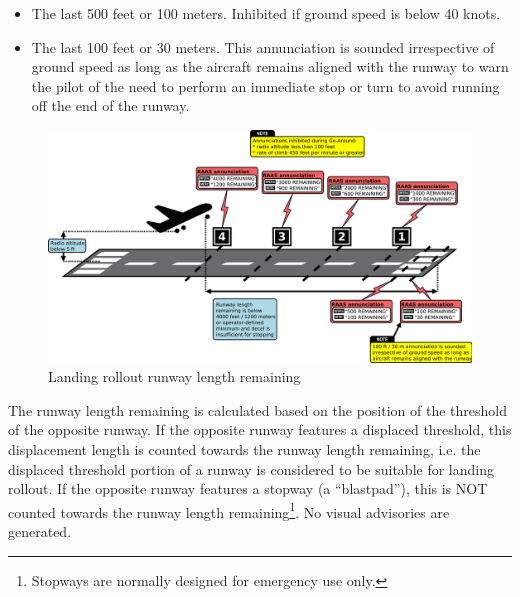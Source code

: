\documentclass[a4paper,12pt]{article}
\begin{document}
\begin{itemize}

\item The last 500 feet or 100 meters. Inhibited if ground speed is below
40 knots.

\item The last 100 feet or 30 meters. This annunciation is sounded
irrespective of ground speed as long as the aircraft remains aligned with
the runway to warn the pilot of the need to perform an immediate stop or
turn to avoid running off the end of the runway.

\end{itemize}

\begin{figure}[H]
\begin{center}
\includegraphics[width=\textwidth]{../src/land_rollout.pdf}
\end{center}
\caption{Landing rollout runway length remaining}
\end{figure}

\noindent The runway length remaining is calculated based on the position
of the threshold of the opposite runway. If the opposite runway features
a displaced threshold, this displacement length is counted towards the
runway length remaining, i.e. the displaced threshold portion of a runway
is considered to be suitable for landing rollout. If the opposite runway
features a stopway (a ``blastpad''), this is NOT counted towards the
runway length remaining\footnote{Stopways are normally designed for
emergency use only.}.  No visual advisories are generated.
\end{document}
